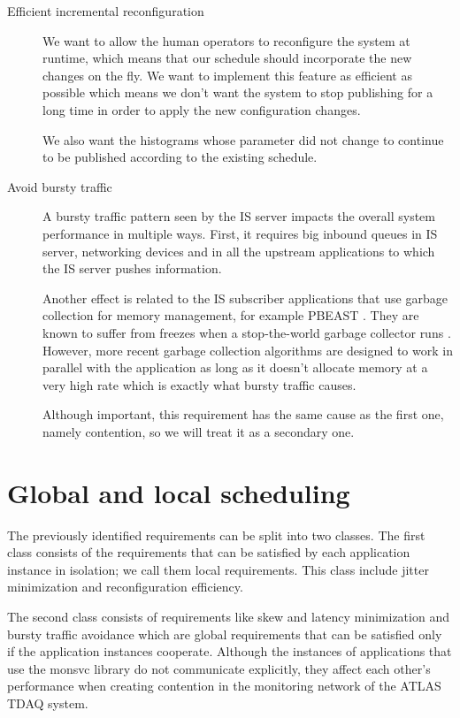 \begin{description}
\item [Efficient incremental reconfiguration]

We want to allow the human operators to reconfigure the system at runtime, which means that our schedule should incorporate the new changes on the fly. We want to implement this feature as efficient as possible which means we don't want the system to stop publishing for a long time in order to apply the new configuration changes. 

We also want the histograms whose parameter did not change to continue to be published according to the existing schedule.

\item [Avoid bursty traffic]

A bursty traffic pattern seen by the IS server impacts the overall system performance in multiple ways. First, it requires big inbound queues in IS server, networking devices and in all the upstream applications to which the IS server pushes information. 

Another effect is related to the IS subscriber applications that use garbage collection for memory management, for example PBEAST \citep{sicoe2012persistent}. They are known to suffer from freezes when a stop-the-world garbage collector runs \citep{aho2007compilers}. However, more recent garbage collection algorithms \citep{printezis2005garbage} are designed to work in parallel with the application as long as it doesn't allocate memory at a very high rate which is exactly what bursty traffic causes.

Although important, this requirement has the same cause as the first one, namely contention, so we will treat it as a secondary one.

\end{description}

\section{Global and local scheduling}

The previously identified requirements can be split into two classes. The first class consists of the requirements that can be satisfied by each application instance in isolation; we call them local requirements. This class include jitter minimization and reconfiguration efficiency. 

The second class consists of requirements like skew and latency minimization and bursty traffic avoidance which are global requirements that can be satisfied only if the application instances cooperate. Although the instances of applications that use the monsvc library do not communicate explicitly, they affect each other's performance when creating contention in the monitoring network of the ATLAS TDAQ system. 


